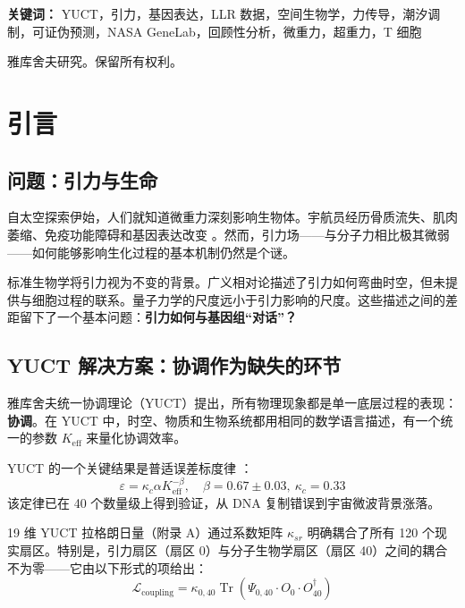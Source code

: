 \documentclass[12pt,a4paper]{article}
\theoremstyle{remark}
\newcommand{\Keff}{K_{\mathrm{eff}}}
\newcommand{\kappac}{\kappa_c}
\newcommand{\eps}{\varepsilon}
\begin{document}
\begin{titlepage}
\begin{center}
			\vspace{1cm}
			
			\noindent
			\small\textbf{关键词：} YUCT，引力，基因表达，LLR 数据，空间生物学，力传导，潮汐调制，可证伪预测，NASA GeneLab，回顾性分析，微重力，超重力，T 细胞
			
			\vspace{0.5cm}
			
			\noindent
			 雅库舍夫研究。保留所有权利。
		\end{center}
	\end{titlepage}
	
	\tableofcontents
	\newpage
	
	\section{引言}
	\label{sec:intro}
	
	\subsection{问题：引力与生命}
	
	自太空探索伊始，人们就知道微重力深刻影响生物体。宇航员经历骨质流失、肌肉萎缩、免疫功能障碍和基因表达改变 \cite{NASA-GeneLab, SpaceX-2023}。然而，引力场——与分子力相比极其微弱——如何能够影响生化过程的基本机制仍然是个谜。
	
	标准生物学将引力视为不变的背景。广义相对论描述了引力如何弯曲时空，但未提供与细胞过程的联系。量子力学的尺度远小于引力影响的尺度。这些描述之间的差距留下了一个基本问题：\textbf{引力如何与基因组“对话”？}
	
	\subsection{YUCT 解决方案：协调作为缺失的环节}
	
	雅库舍夫统一协调理论（YUCT）提出，所有物理现象都是单一底层过程的表现：\textbf{协调}。在 YUCT 中，时空、物质和生物系统都用相同的数学语言描述，有一个统一的参数 \(\Keff\) 来量化协调效率。
	
	YUCT 的一个关键结果是普适误差标度律 \cite{AppendixL}：
	\begin{equation}
		\eps = \kappac \alpha \Keff^{-\beta}, \quad \beta = 0.67 \pm 0.03,\ \kappac = 0.33
		\label{eq:universal-scaling}
	\end{equation}
	该定律已在 40 个数量级上得到验证，从 DNA 复制错误到宇宙微波背景涨落。
	
	19 维 YUCT 拉格朗日量（附录 A）通过系数矩阵 \(\kappa_{sr}\) 明确耦合了所有 120 个现实扇区。特别是，引力扇区（扇区 0）与分子生物学扇区（扇区 40）之间的耦合不为零——它由以下形式的项给出：
	\begin{equation}
		\mathcal{L}_{\text{coupling}} = \kappa_{0,40} \operatorname{Tr}(\Psi_{0,40} \cdot O_0 \cdot O_{40}^\dagger)
		\label{eq:coupling-general}
	\end{equation}
	
\end{document}
